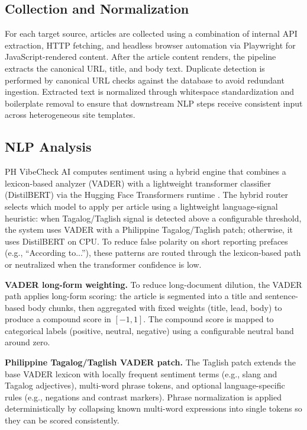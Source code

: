 \documentclass[sigconf, nonacm]{acmart}
\begin{document}
\subsection{Collection and Normalization}
For each target source, articles are collected using a combination of internal API extraction, HTTP fetching, and headless browser automation via Playwright for JavaScript-rendered content. After the article content renders, the pipeline extracts the canonical URL, title, and body text. Duplicate detection is performed by canonical URL checks against the database to avoid redundant ingestion. Extracted text is normalized through whitespace standardization and boilerplate removal to ensure that downstream NLP steps receive consistent input across heterogeneous site templates.

\subsection{NLP Analysis}
\label{subsec:nlp-analysis}
PH VibeCheck AI computes sentiment using a hybrid engine that combines a lexicon-based analyzer (VADER) \cite{hutto2014vader} with a lightweight transformer classifier (DistilBERT) \cite{sanh2019distilbert,devlin2018bert} via the Hugging Face Transformers runtime \cite{huggingface_transformers}. The hybrid router selects which model to apply per article using a lightweight language-signal heuristic: when Tagalog/Taglish signal is detected above a configurable threshold, the system uses VADER with a Philippine Tagalog/Taglish patch; otherwise, it uses DistilBERT on CPU. To reduce false polarity on short reporting prefaces (e.g., ``According to...''), these patterns are routed through the lexicon-based path or neutralized when the transformer confidence is low.

\textbf{VADER long-form weighting.} To reduce long-document dilution, the VADER path applies long-form scoring: the article is segmented into a title and sentence-based body chunks, then aggregated with fixed weights (title, lead, body) to produce a compound score in $[-1,1]$. The compound score is mapped to categorical labels (positive, neutral, negative) using a configurable neutral band around zero.

\textbf{Philippine Tagalog/Taglish VADER patch.} The Taglish patch extends the base VADER lexicon with locally frequent sentiment terms (e.g., slang and Tagalog adjectives), multi-word phrase tokens, and optional language-specific rules (e.g., negations and contrast markers). Phrase normalization is applied deterministically by collapsing known multi-word expressions into single tokens so they can be scored consistently.
\end{document}

